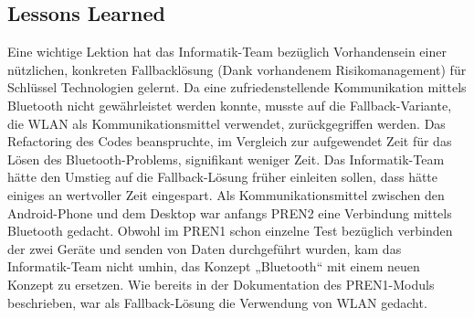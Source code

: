 \subsection{Lessons Learned}
Eine wichtige Lektion hat das Informatik-Team bezüglich Vorhandensein einer nützlichen, 
konkreten Fallbacklösung (Dank vorhandenem Risikomanagement) für Schlüssel Technologien gelernt. 
Da eine zufriedenstellende Kommunikation mittels Bluetooth nicht gewährleistet werden konnte, 
musste auf die Fallback-Variante, die WLAN als Kommunikationsmittel verwendet, zurückgegriffen werden. 
Das Refactoring des Codes beanspruchte, im Vergleich zur aufgewendet Zeit für das Lösen des Bluetooth-Problems, 
signifikant weniger Zeit. Das Informatik-Team hätte den Umstieg auf die Fallback-Lösung früher einleiten sollen, 
dass hätte einiges an wertvoller Zeit eingespart.
\newline
\newline
Als Kommunikationsmittel zwischen den Android-Phone und dem Desktop war anfangs PREN2 eine Verbindung 
mittels Bluetooth gedacht. Obwohl im PREN1 schon einzelne Test bezüglich verbinden der zwei Geräte und 
senden von Daten durchgeführt wurden, kam das Informatik-Team nicht umhin, das Konzept „Bluetooth“ mit einem neuen 
Konzept zu ersetzen. Wie bereits in der Dokumentation des PREN1-Moduls beschrieben, war als Fallback-Lösung 
die Verwendung von WLAN gedacht. 